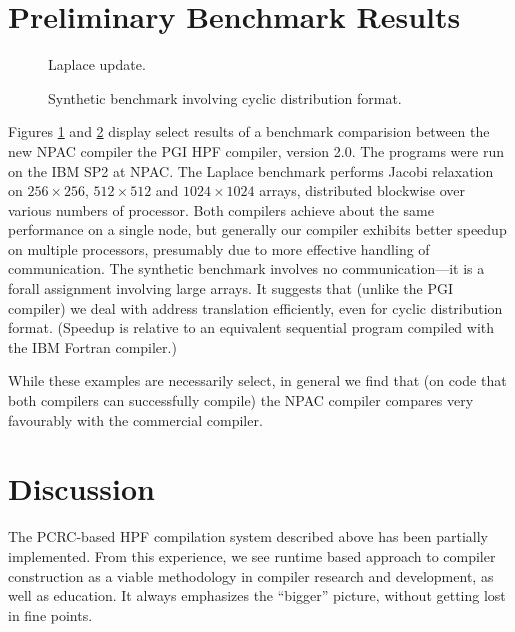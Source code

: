 \section{Preliminary Benchmark Results\label{benchmarks}}

\begin{figure}[tb]
\centerline{}
\caption{Laplace update.}
\label{bench1}
\end{figure}

\begin{figure}[tb]
\centerline{}
\caption{Synthetic benchmark involving cyclic distribution format.}
\label{bench2}
\end{figure}

Figures \ref{bench1} and \ref{bench2} display select results of a
benchmark comparision between the new NPAC compiler the PGI HPF
compiler, version 2.0.  The programs were run on the IBM SP2 at NPAC.
The Laplace benchmark performs Jacobi relaxation on $256 \times 256$,
$512 \times 512$ and $1024 \times 1024$ arrays, distributed blockwise
over various numbers of processor.  Both compilers achieve about the
same performance on a single node, but generally our compiler exhibits
better speedup on multiple processors, presumably due to more effective
handling of communication.  The synthetic benchmark involves no
communication---it is a forall assignment involving large arrays.  It
suggests that (unlike the PGI compiler) we deal with address
translation efficiently, even for cyclic distribution format.  (Speedup
is relative to an equivalent sequential program compiled with the IBM
Fortran compiler.)

While these examples are necessarily select, in general we find that
(on code that both compilers can successfully compile) the NPAC compiler
compares very favourably with the commercial compiler.


\section{Discussion\label{discussion}}

The PCRC-based HPF compilation system described above has been
partially implemented.  From this experience, we see runtime
based approach to compiler construction as a viable methodology
in compiler research and development, as well as education.  It 
always emphasizes the ``bigger'' picture, without getting lost in 
fine points.

